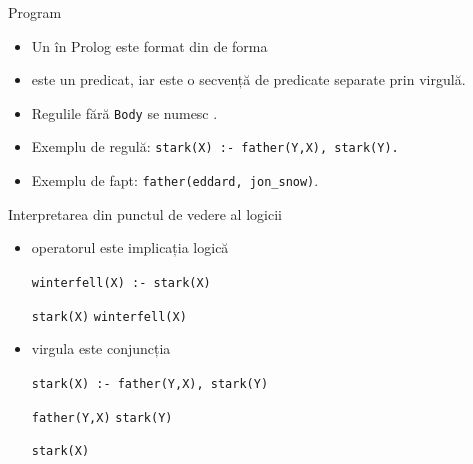 \documentclass[xcolor=x11names,compress,10pt]{beamer}
\begin{document}
\begin{frame}{Program }

\begin{itemize}
	\item Un  în Prolog este format din  de forma
	\begin{center}
	\end{center} 
	\medskip
	
\item {} este un predicat, iar  este o secvență de predicate separate prin virgulă.

\medskip
	
\item Regulile fără \texttt{Body} se numesc .
\end{itemize}

\medskip \pause
\begin{example}
\begin{itemize}
	\item  Exemplu de regulă: \texttt{stark(X) :- father(Y,X), stark(Y).}
	\item  Exemplu de fapt: \texttt{father(eddard, jon\_snow)}.
\end{itemize}
\end{example}
\end{frame}


\begin{frame}{Interpretarea din punctul de vedere al logicii}
\vspace*{0.3cm}

\begin{itemize}
\item operatorul \intens{\textbf{:-}} este implicația logică
 \intens{$\leftarrow$}
\begin{example}
\texttt{winterfell(X) :- stark(X)}
\smallskip

 \texttt{stark(X)}  
\texttt{winterfell(X)} 
\end{example}
\pause

\item virgula \intens{,} este conjuncția \intens{$\wedge$}

\begin{example}
\texttt{stark(X) :- father(Y,X), stark(Y)}

\smallskip

 \texttt{father(Y,X)}  \texttt{stark(Y)}  

 \texttt{stark(X)} 
\end{example}
\end{itemize}
\end{frame}
\end{document}
